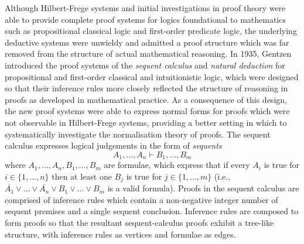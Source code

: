 \documentclass[10pt]{article}
\theoremstyle{definition}\newtheorem{remark}[theorem]{Remark}
\theoremstyle{definition}\newtheorem{example}[theorem]{Example}
\theoremstyle{definition}\newtheorem{definition}[theorem]{Definition}
\begin{document}
	Although Hilbert-Frege systems and initial investigations in proof theory were able to provide complete proof systems for logics foundational to mathematics such as propositional classical logic and first-order predicate logic, the underlying deductive systems were unwieldy and admitted a proof structure which was far removed from the structure of actual mathematical reasoning. In 1935, Gentzen \cite{GentzenInvestigations} introduced the proof systems of the \textit{sequent calculus} and \textit{natural deduction} for propositional and first-order classical and intuitionistic logic, which were designed so that their inference rules more closely reflected the structure of reasoning in proofs as developed in mathematical practice. As a consequence of this design, the new proof systems were able to express normal forms for proofs which were not observable in Hilbert-Frege systems, providing a better setting in which to systematically investigate the normalisation theory of proofs. The sequent calculus expresses logical judgements in the form of \textit{sequents}
	\[
		A_1, \dots, A_n \vdash B_1, \dots, B_m
	\]
	where $A_1, \dots, A_n, B_1, \dots, B_m$ are formulae, which express that if every $A_i$ is true for $i \in \{1, \dots, n\}$ then at least one $B_j$ is true for $j \in \{1, \dots, m\}$ (i.e., $\overline{A_1} \lor \dots \lor \overline{A_n} \lor B_1 \lor \dots \lor B_m$ is a valid formula). Proofs in the sequent calculus are comprised of inference rules which contain a non-negative integer number of sequent premises and a single sequent conclusion. Inference rules are composed to form proofs so that the resultant sequent-calculus proofs exhibit a tree-like structure, with inference rules as vertices and formulae as edges.
	
\end{document}
